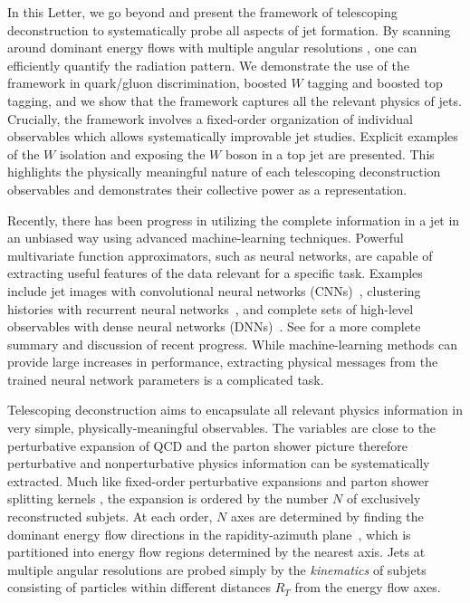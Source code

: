 \documentclass[notoc]{JHEP3}
\begin{document}
In this Letter, we go beyond \cite{Chien:2017xrb} and present the framework of telescoping deconstruction to systematically probe all aspects of jet formation. By scanning around dominant energy flows with multiple angular resolutions \cite{Chien:2013kca,Chien:2014hla}, one can efficiently quantify the radiation pattern. We demonstrate the use of the framework
in quark/gluon discrimination, boosted $W$ tagging and boosted top tagging, and we show that the framework captures all the relevant physics of jets. Crucially, the framework involves a fixed-order organization of individual observables which allows systematically improvable jet studies. Explicit examples of the $W$ isolation \cite{Chien:2017xrb} and exposing the $W$ boson in a top jet are presented. This highlights the physically meaningful nature of each telescoping deconstruction observables and demonstrates their collective power as a representation.

Recently, there has been progress in utilizing the complete information in a jet in an unbiased way %
using advanced machine-learning techniques. Powerful multivariate function approximators, such as neural networks, are capable of extracting useful features of the data relevant for a specific task. Examples include jet images with convolutional neural networks (CNNs)~\cite{Cogan:2014oua,deOliveira:2015xxd,Komiske:2016rsd,Kasieczka:2017nvn}, clustering histories with recurrent neural networks~\cite{Louppe:2017ipp}, and complete sets of high-level observables with dense neural networks (DNNs)~\cite{Datta:2017rhs,Datta:2017lxt,Aguilar-Saavedra:2017rzt}. See \cite{Larkoski:2017jix} for a more complete summary and discussion of recent progress. While machine-learning methods can provide large increases in performance, extracting physical messages from the trained neural network parameters is a complicated task.

Telescoping deconstruction aims to encapsulate all relevant physics information in very simple, physically-meaningful observables. The variables are close to the perturbative expansion of QCD and the parton shower picture therefore perturbative and nonperturbative physics information can be systematically extracted. Much like fixed-order perturbative expansions and parton shower splitting kernels \cite{Nagy:2017ggp}, the expansion is ordered by the number $N$ of exclusively reconstructed subjets. %
At each order, %
$N$ axes are determined by finding the dominant energy flow directions in the rapidity-azimuth plane~\cite{Stewart:2010tn,Chien:2013kca,Stewart:2015waa,Thaler:2015xaa}, which is partitioned into energy flow regions determined by the nearest axis. %
Jets at multiple angular resolutions are probed simply by the {\sl kinematics} of subjets consisting of %
particles within different distances $R_T$ from %
the energy flow axes.
\end{document}
